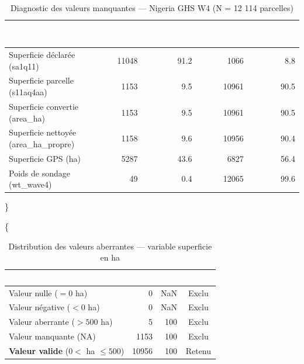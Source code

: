 \documentclass[
  french,
  10pt,
]{article}
\begin{document}
\begin{table}

\caption{\label{tab:missing-table}Diagnostic des valeurs manquantes --- Nigeria GHS W4 (N = 12 114 parcelles)}
\centering
\begin{tabular}[t]{lrrrr}
\toprule
\cellcolor{NavyBlue}\textcolor{white}{\textbf{Variable}} & \cellcolor{NavyBlue}\textcolor{white}{\textbf{N manquants}} & \cellcolor{NavyBlue}\textcolor{white}{\textbf{\% manquants}} & \cellcolor{NavyBlue}\textcolor{white}{\textbf{N renseignés}} & \cellcolor{NavyBlue}\textcolor{white}{\textbf{\% renseignés}}\\
\midrule
Superficie déclarée (sa1q11) & 11048 & 91.2 & 1066 & 8.8\\
Superficie parcelle (s11aq4aa) & 1153 & 9.5 & 10961 & 90.5\\
Superficie convertie (area\_ha) & 1153 & 9.5 & 10961 & 90.5\\
Superficie nettoyée (area\_ha\_propre) & 1158 & 9.6 & 10956 & 90.4\\
Superficie GPS (ha) & 5287 & 43.6 & 6827 & 56.4\\
Poids de sondage (wt\_wave4) & 49 & 0.4 & 12065 & 99.6\\
\bottomrule
\end{tabular}
\end{table}

\}

\{ \small {}

\begin{table}

\caption{\label{tab:outliers-table}Distribution des valeurs aberrantes --- variable superficie en ha}
\centering
\begin{tabular}[t]{lrrc}
\toprule
\cellcolor{NavyBlue}\textcolor{white}{\textbf{Catégorie}} & \cellcolor{NavyBlue}\textcolor{white}{\textbf{N}} & \cellcolor{NavyBlue}\textcolor{white}{\textbf{\%}} & \cellcolor{NavyBlue}\textcolor{white}{\textbf{Statut}}\\
\midrule
Valeur nulle ($= 0$ ha) & 0 & NaN & Exclu\\
Valeur négative ($< 0$ ha) & 0 & NaN & Exclu\\
Valeur aberrante ($> 500$ ha) & 5 & 100 & Exclu\\
Valeur manquante (NA) & 1153 & 100 & Exclu\\
\textbf{Valeur valide} ($0 <$ ha $\leq 500$) & 10956 & 100 & \textcolor{SuccessGreen}{Retenu}\\
\bottomrule
\end{tabular}
\end{table}
\end{document}
